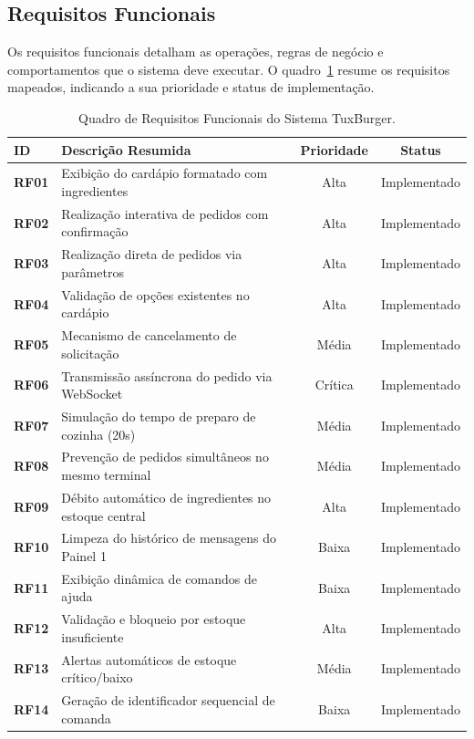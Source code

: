 \documentclass[12pt]{article}
\begin{document}
\subsection{Requisitos Funcionais}

Os requisitos funcionais detalham as operações, regras de negócio e comportamentos que o sistema deve executar. O quadro~\ref{tab:rf} resume os requisitos mapeados, indicando a sua prioridade e status de implementação.

\begin{table}[htbp]
\centering
\small
\begin{tabularx}{\textwidth}{l X c c}
\toprule
\textbf{ID} & \textbf{Descrição Resumida} & \textbf{Prioridade} & \textbf{Status} \\
\midrule
\textbf{RF01} & Exibição do cardápio formatado com ingredientes & Alta & Implementado \\
\textbf{RF02} & Realização interativa de pedidos com confirmação & Alta & Implementado \\
\textbf{RF03} & Realização direta de pedidos via parâmetros & Alta & Implementado \\
\textbf{RF04} & Validação de opções existentes no cardápio & Alta & Implementado \\
\textbf{RF05} & Mecanismo de cancelamento de solicitação & Média & Implementado \\
\textbf{RF06} & Transmissão assíncrona do pedido via WebSocket & Crítica & Implementado \\
\textbf{RF07} & Simulação do tempo de preparo de cozinha (20s) & Média & Implementado \\
\textbf{RF08} & Prevenção de pedidos simultâneos no mesmo terminal & Média & Implementado \\
\textbf{RF09} & Débito automático de ingredientes no estoque central & Alta & Implementado \\
\textbf{RF10} & Limpeza do histórico de mensagens do Painel 1 & Baixa & Implementado \\
\textbf{RF11} & Exibição dinâmica de comandos de ajuda & Baixa & Implementado \\
\textbf{RF12} & Validação e bloqueio por estoque insuficiente & Alta & Implementado \\
\textbf{RF13} & Alertas automáticos de estoque crítico/baixo & Média & Implementado \\
\textbf{RF14} & Geração de identificador sequencial de comanda & Baixa & Implementado \\
\bottomrule
\end{tabularx}
\caption{Quadro de Requisitos Funcionais do Sistema TuxBurger.}
\label{tab:rf}
\end{table}
\end{document}
